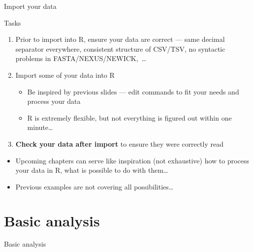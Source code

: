 \documentclass[compress, ucs, xelatex, 11pt, xcolor=svgnames,
  hyperref={
    bookmarks=true,
    unicode=true,
    colorlinks=true,
    pdftitle={Molecular data in R},
    plainpages=false,
    pdfauthor={Vojtech Zeisek},
    pdfsubject={Course about phylogeny and evolution in R},
    pdfcreator={XeLaTeX},
    pdfkeywords={R, evolution, phylogeny, molecular data},
    linkcolor=Tomato,
    anchorcolor=SaddleBrown,
    citecolor=Goldenrod,
    filecolor=DarkMagenta,
    menucolor=Sienna,
    urlcolor=DarkTurquoise,
    pdftex},
  url={hyphens, lowtilde} %
  ]{beamer}
\begin{document}
\begin{frame}{Import your data}
  \begin{block}{Tasks}
    \begin{enumerate}
      \item Prior to import into R, \alert{ensure your data are correct} --- same decimal separator everywhere, consistent structure of CSV/TSV, no syntactic problems in FASTA/NEXUS/NEWICK,~\ldots
      \item Import some of your data into R
      \begin{itemize}
	\item Be inspired by previous slides --- edit commands to fit your needs and process your data
	\item R is extremely flexible, but not everything is figured out within one minute\ldots
      \end{itemize}
      \item \textbf{Check your data after import} to ensure they were correctly read
    \end{enumerate}
  \end{block}
  \begin{itemize}
    \item Upcoming chapters can serve like inspiration (not exhaustive) how to process your data in R, what is possible to do with them\ldots
    \item Previous examples are not covering all possibilities\ldots
  \end{itemize}
\end{frame}

\section{Basic analysis}

\begin{frame}{Basic analysis}
  \tableofcontents[currentsection, sectionstyle=show/hide, hideothersubsections]
\end{frame}
\end{document}
